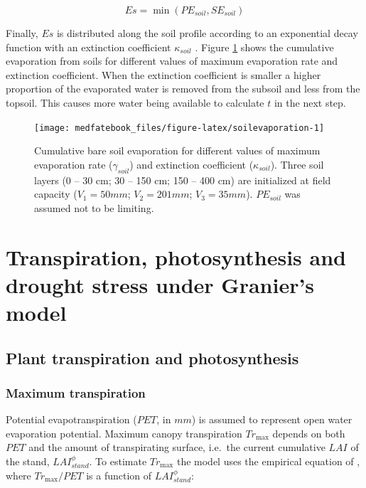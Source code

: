 \documentclass[]{book}
\begin{document}
\begin{equation}
Es = \min(PE_{soil}, SE_{soil})
\end{equation}

Finally, \(Es\) is distributed along the soil profile according to an
exponential decay function with an extinction coefficient
\(\kappa_{soil}\) \citep{Mouillot2001}. Figure \ref{fig:soilevaporation}
shows the cumulative evaporation from soils for different values of
maximum evaporation rate and extinction coefficient. When the extinction
coefficient is smaller a higher proportion of the evaporated water is
removed from the subsoil and less from the topsoil. This causes more
water being available to calculate \(t\) in the next step.








\begin{figure}

{\centering \texttt{[image: medfatebook\_files/figure-latex/soilevaporation-1]} 

}

\caption{Cumulative bare soil evaporation for different
values of maximum evaporation rate (\(\gamma_{soil}\)) and extinction
coefficient (\(\kappa_{soil}\)). Three soil layers (0 -- 30 cm; 30 --
150 cm; 150 -- 400 cm) are initialized at field capacity
(\(V_1 = 50 mm\); \(V_2 = 201 mm\); \(V_3 = 35 mm\)). \(PE_{soil}\) was
assumed not to be limiting.}\label{fig:soilevaporation}
\end{figure}

\chapter{Transpiration, photosynthesis and drought stress under
Granier's model}\label{transpirationgranier}

\section{Plant transpiration and
photosynthesis}\label{plant-transpiration-and-photosynthesis}

\subsection{Maximum transpiration}\label{maximum-transpiration}

Potential evapotranspiration (\(PET\), in \(mm\)) is assumed to
represent open water evaporation potential. Maximum canopy transpiration
\(Tr_{\max}\) depends on both \(PET\) and the amount of transpirating
surface, i.e.~the current cumulative \(LAI\) of the stand,
\(LAI^{\phi}_{stand}\). To estimate \(Tr_{\max}\) the model uses the
empirical equation of \citet{Granier1999}, where \(Tr_{\max}/PET\) is a
function of \(LAI^{\phi}_{stand}\):
\end{document}
